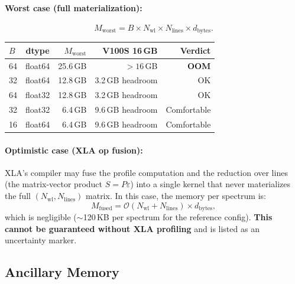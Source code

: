 \documentclass[11pt]{article}
\begin{document}
\paragraph{Worst case (full materialization):}
\begin{equation}
  \label{eq:mem-worst}
  M_\mathrm{worst} = B \times N_\mathrm{wl} \times N_\mathrm{lines} \times d_\mathrm{bytes}.
\end{equation}

\begin{center}
\begin{tabular}{lcrrr}
\toprule
$B$ & dtype & $M_\mathrm{worst}$ & V100S 16\,GB & Verdict \\
\midrule
64  & float64 & 25.6\,GB & $>16$\,GB & \textbf{OOM} \\
32  & float64 & 12.8\,GB & 3.2\,GB headroom & OK \\
64  & float32 & 12.8\,GB & 3.2\,GB headroom & OK \\
32  & float32 &  6.4\,GB & 9.6\,GB headroom & Comfortable \\
16  & float64 &  6.4\,GB & 9.6\,GB headroom & Comfortable \\
\bottomrule
\end{tabular}
\end{center}

\paragraph{Optimistic case (XLA op fusion):}
XLA's compiler may fuse the profile computation and the reduction
over lines (the matrix-vector product $S = P\varepsilon$) into a single
kernel that never materializes the full $(N_\mathrm{wl}, N_\mathrm{lines})$
matrix. In this case, the memory per spectrum is:
\begin{equation}
  \label{eq:mem-fused}
  M_\mathrm{fused} = \mathcal{O}(N_\mathrm{wl} + N_\mathrm{lines}) \times d_\mathrm{bytes},
\end{equation}
which is negligible ($\sim$120\,KB per spectrum for the reference config).
\textbf{This cannot be guaranteed without XLA profiling} and is listed
as an uncertainty marker.

\subsection{Ancillary Memory}
\label{sec:ancillary}
\end{document}
